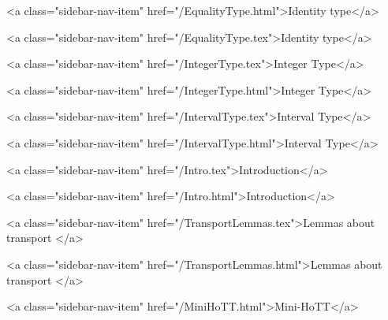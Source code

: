       
        
          <a class="sidebar-nav-item" href="/EqualityType.html">Identity type</a>
        
      
    
      
        
          <a class="sidebar-nav-item" href="/EqualityType.tex">Identity type</a>
        
      
    
      
        
          <a class="sidebar-nav-item" href="/IntegerType.tex">Integer Type</a>
        
      
    
      
        
          <a class="sidebar-nav-item" href="/IntegerType.html">Integer Type</a>
        
      
    
      
        
          <a class="sidebar-nav-item" href="/IntervalType.tex">Interval Type</a>
        
      
    
      
        
          <a class="sidebar-nav-item" href="/IntervalType.html">Interval Type</a>
        
      
    
      
        
          <a class="sidebar-nav-item" href="/Intro.tex">Introduction</a>
        
      
    
      
        
          <a class="sidebar-nav-item" href="/Intro.html">Introduction</a>
        
      
    
      
        
          <a class="sidebar-nav-item" href="/TransportLemmas.tex">Lemmas about transport </a>
        
      
    
      
        
          <a class="sidebar-nav-item" href="/TransportLemmas.html">Lemmas about transport </a>
        
      
    
      
        
          <a class="sidebar-nav-item" href="/MiniHoTT.html">Mini-HoTT</a>
        
      
    
